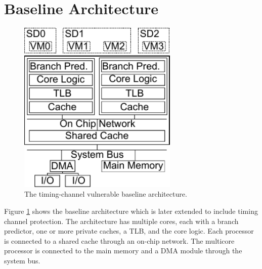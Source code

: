 \section{Baseline Architecture}

    \begin{figure}
        \begin{center}
            \includegraphics[width=3in]{figs/baseline.pdf}
            \caption{The timing-channel vulnerable baseline architecture.}
            \label{fig:baseline}
        \end{center}
    \end{figure}

    Figure \ref{fig:baseline} shows the baseline architecture which is later 
    extended to include timing channel protection. The architecture has 
    multiple cores, each with a branch predictor, one or more private caches, a 
    TLB, and the core logic. Each processor is connected to a shared cache 
    through an on-chip network. The multicore processor is connected to the 
    main memory and a DMA module through the system bus. 

